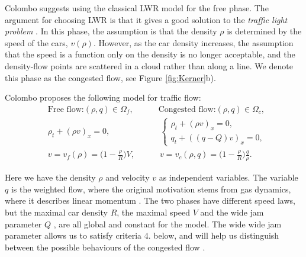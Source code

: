\documentclass[10pt]{article}
\numberwithin{equation}{section}
\begin{document}
Colombo suggests using the classical LWR model for the free phase. The argument for choosing LWR is that it gives a good solution to the \textit{traffic light problem} \cite[p.~71]{TrafficLight}. In this phase, the assumption is that the density $\rho$ is determined by the speed of the cars, $v(\rho)$. However, as the car density increases, the assumption that the speed is a function only on the density is no longer acceptable, and the density-flow points are scattered in a cloud rather than along a line. We denote this phase as the congested flow, see Figure \ref{fig:Kerner}b). 

Colombo proposes the following model for traffic flow: 
\begin{align}
    & \text{Free flow:}  (\rho, q) \in \Omega_f, \quad \quad \quad \text{Congested flow:} (\rho, q) \in \Omega_c, \nonumber \\
    & \rho_t + (\rho v )_x = 0, \quad \quad   \quad \quad \quad \quad 
    \begin{cases}
    \rho_t + (\rho v )_x = 0 , \\
    q_t + ((q-Q)v)_x = 0 ,
    \end{cases} \label{Eq:phase-transition} \\
    & v = v_f(\rho) = \big(1- \frac{\rho}{R}\big)V, \quad \quad \quad v = v_c(\rho,q) = \big(1 - \frac{\rho}{R}\big)\frac{q}{\rho}. \nonumber
\end{align}

Here we have the density $\rho$ and velocity $v$ as independent variables. The variable $q$ is the weighted flow, where the original motivation stems from gas dynamics, where it describes linear momentum \cite{Bressan}. The two phases have different speed laws, but the maximal car density $R$, the maximal speed $V$ and the wide jam parameter $Q$ \cite{GaravelloMauro2006Tfon}, are all global and constant for the model. The wide wide jam parameter allows us to satisfy criteria $4.$ below, and will help us distinguish between the possible behaviours of the congested flow \cite{Colombo2003}. 
\end{document}
